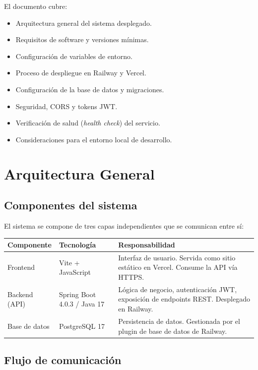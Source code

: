 \documentclass[11pt, a4paper]{article}
\begin{document}
El documento cubre:
\begin{itemize}
  \item Arquitectura general del sistema desplegado.
  \item Requisitos de software y versiones mínimas.
  \item Configuración de variables de entorno.
  \item Proceso de despliegue en Railway y Vercel.
  \item Configuración de la base de datos y migraciones.
  \item Seguridad, CORS y tokens JWT.
  \item Verificación de salud (\textit{health check}) del servicio.
  \item Consideraciones para el entorno local de desarrollo.
\end{itemize}

\section{Arquitectura General}

\subsection{Componentes del sistema}

El sistema se compone de tres capas independientes que se comunican entre sí:

\begin{center}
\begin{tabular}{L{3.2cm} L{3.5cm} L{6.5cm}}
\toprule
\textbf{Componente} & \textbf{Tecnología} & \textbf{Responsabilidad} \\
\midrule
Frontend & Vite + JavaScript & Interfaz de usuario. Servida como sitio estático en Vercel. Consume la API vía HTTPS. \\
\addlinespace
Backend (API) & Spring Boot 4.0.3 / Java 17 & Lógica de negocio, autenticación JWT, exposición de endpoints REST. Desplegado en Railway. \\
\addlinespace
Base de datos & PostgreSQL 17 & Persistencia de datos. Gestionada por el plugin de base de datos de Railway. \\
\bottomrule
\end{tabular}
\end{center}

\subsection{Flujo de comunicación}
\end{document}
